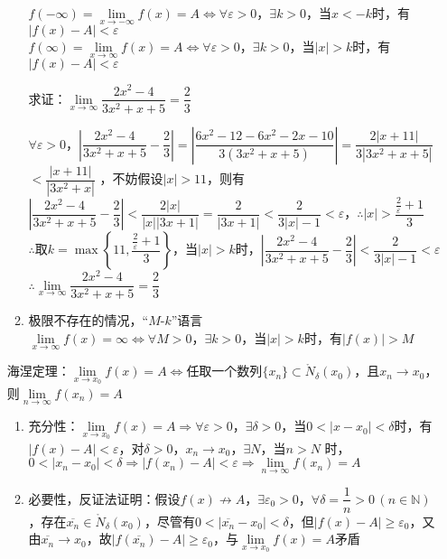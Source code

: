 \documentclass[11pt,fleqn]{book} %
\begin{document}
\begin{enumerate}
\begin{enumerate}[label=(\arabic*)]
$f(-\infty)=\lim\limits_{x\rightarrow -\infty}f(x)=A \Longleftrightarrow \forall \varepsilon>0$，$\exists k>0$，当$x<-k$时，有$|f(x)-A|<\varepsilon$\\
$f(\infty)=\lim\limits_{x\rightarrow \infty}f(x)=A \Longleftrightarrow \forall \varepsilon>0$，$\exists k>0$，当$|x|>k$时，有$|f(x)-A|<\varepsilon$
\begin{example}
 求证：$\lim\limits_{x\rightarrow \infty} \dfrac{2x^2-4}{3x^2+x+5} = \dfrac{2}{3}$
\end{example}
\begin{prove}
 $\forall \varepsilon>0$，$\left|\dfrac{2x^2-4}{3x^2+x+5}-\dfrac{2}{3}\right|=\left|\dfrac{6x^2-12-6x^2-2x-10}{3(3x^2+x+5)}\right|=\dfrac{2|x+11|}{3|3x^2+x+5|}$ \\
$<\dfrac{|x+11|}{|3x^2+x|}$ ，不妨假设$|x|>11$，则有$\left|\dfrac{2x^2-4}{3x^2+x+5}-\dfrac{2}{3}\right|<\dfrac{2|x|}{|x||3x+1|}=\dfrac{2}{|3x+1|}<\dfrac{2}{3|x|-1}<\varepsilon$，$\therefore |x|>\dfrac{\frac{2}{\varepsilon}+1}{3}$\\
$\therefore$取$k = \max\left\{11, \dfrac{\frac{2}{\varepsilon}+1}{3}\right\}$，当$|x|>k$时，$\left|\dfrac{2x^2-4}{3x^2+x+5}-\dfrac{2}{3}\right|<\dfrac{2}{3|x|-1}<\varepsilon$
$\therefore \lim\limits_{x\rightarrow \infty} \dfrac{2x^2-4}{3x^2+x+5} = \dfrac{2}{3}$
\end{prove}
  \item 极限不存在的情况，“$M$-$k$”语言\\
$\lim\limits_{x\rightarrow \infty}f(x) = \infty \Longleftrightarrow \forall M>0$，$\exists k > 0$，当$|x|>k$时，有$|f(x)|>M$
\end{enumerate}
\begin{theorem}
海涅定理：$\lim\limits_{x\rightarrow x_0}f(x)=A \Longleftrightarrow$任取一个数列$\{x_n\}\subset \mathring{N}_\delta(x_0)$，且$x_n\rightarrow x_0$，则$\lim\limits_{n\rightarrow \infty}f(x_n)=A$
\end{theorem}
\begin{prove}
\begin{enumerate}[label=(\arabic*)]
  \item 充分性：$\lim\limits_{x\rightarrow x_0}f(x)=A \Rightarrow \forall \varepsilon>0$，$\exists \delta >0$，当$0<|x-x_0|<\delta$时，有$|f(x)-A|<\varepsilon$，对$\delta>0$，$x_n\rightarrow x_0$，$\exists N$，当$n>N$ 时，$0<|x_n-x_0|<\delta \Rightarrow |f(x_n)-A|<\varepsilon\Rightarrow \lim\limits_{n\rightarrow \infty}f(x_n)=A$
  \item 必要性，反证法证明：假设$f(x)\nrightarrow A$，$\exists \varepsilon_0>0$，$\forall \delta = \dfrac{1}{n}>0\, (n \in \mathds{N})$，存在$\overline{x_n} \in \mathring{N}_\delta(x_0)$，尽管有$0<|\overline{x_n}-x_0|<\delta$，但$|f(x)-A|\geqslant \varepsilon_0$，又由$\overline{x_n}\rightarrow x_0$，故$|f(\overline{x_n})-A| \geqslant \varepsilon_0$，与$\lim\limits_{x\rightarrow x_0}f(x)=A$矛盾

\end{enumerate}
\end{prove}
\end{enumerate}
\end{document}
